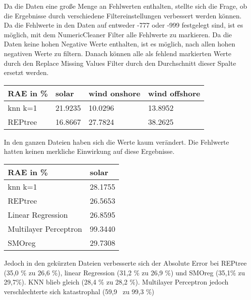 \documentclass[letterpaper]{article} %
\begin{document}
    Da die Daten eine große Menge an Fehlwerten enthalten, stellte sich die Frage, ob die Ergebnisse durch verschiedene Filtereinstellungen verbessert werden können. Da die Fehlwerte in den Daten auf entweder -777 oder -999 festgelegt sind, ist es möglich, mit dem NumericCleaner Filter alle Fehlwerte zu markieren. Da die Daten keine hohen Negative Werte enthalten, ist es möglich, nach allen hohen negativen Werte zu filtern. Danach können alle als fehlend markierten Werte durch den Replace Missing Values Filter durch den Durchschnitt dieser Spalte ersetzt werden.

    \begin{center}
        \begin{tabular}{|l||l|l|l|}
            \hline
            RAE in \%&solar&wind onshore&wind offshore\\
            \hline
            \hline
            knn k=1&21.9235&10.0296&13.8952\\
            \hline
            REPtree&16.8667&27.7824&38.2625\\
            \hline
        \end{tabular}
    \end{center}
    In den ganzen Dateien haben sich die Werte kaum verändert. Die Fehlwerte hatten keinen merkliche Einwirkung auf diese Ergebnisse.
    \hfill\break
    \begin{center}
        \begin{tabular}{|l||l|}
            \hline
            RAE in \%&solar\\
            \hline
            \hline
            knn k=1&28.1755\\
            \hline
            REPtree&26.5653\\
            \hline
            Linear Regression&26.8595\\
            \hline
            Multilayer Perceptron&99.3440\\
            \hline
            SMOreg&29.7308\\
            \hline
        \end{tabular}
    \end{center}
    \hfill\break
    Jedoch in den gekürzten Dateien verbesserte sich der Absolute Error bei REPtree (35,0 \% zu 26,6 \%), linear Regression (31,2 \% zu 26,9 \%) und SMOreg (35,1\% zu 29,7\%). KNN blieb gleich (28,4 \% zu 28,2 \%). Multilayer Perceptron jedoch verschlechterte sich katastrophal (59,9 \ zu 99,3 \%)
\end{document}
